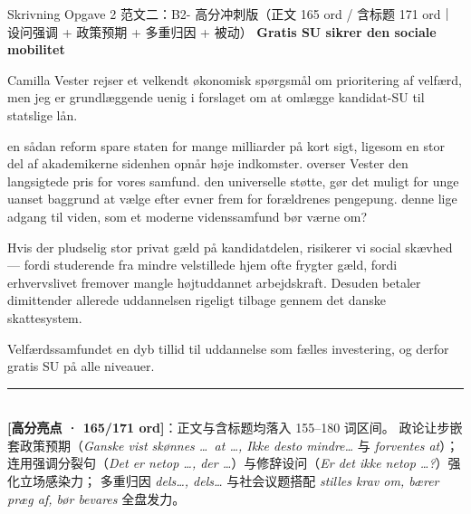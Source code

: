 \begin{emailbox}{Skrivning Opgave 2 范文二：B2- 高分冲刺版（正文 165 ord / 含标题 171 ord｜设问强调 + 政策预期 + 多重归因 + 被动）}
\textbf{\color{NCDNavy}Gratis SU sikrer den sociale mobilitet}

\vspace{0.25em}
Camilla Vester rejser et velkendt økonomisk spørgsmål om prioritering af velfærd, men jeg er grundlæggende uenig i forslaget om at omlægge kandidat-SU til statslige lån.

\vspace{0.25em}
 en sådan reform  spare staten for mange milliarder på kort sigt, ligesom en stor del af akademikerne sidenhen opnår høje indkomster.  overser Vester den langsigtede pris for vores samfund.  den universelle støtte,  gør det muligt for unge uanset baggrund at vælge efter evner frem for forældrenes pengepung.  denne lige adgang til viden, som et moderne videnssamfund bør værne om?

\vspace{0.25em}
Hvis der pludselig  stor privat gæld på kandidatdelen, risikerer vi social skævhed ---  fordi studerende fra mindre velstillede hjem ofte frygter gæld,  fordi erhvervslivet fremover  mangle højtuddannet arbejdskraft. Desuden betaler dimittender allerede uddannelsen rigeligt tilbage gennem det danske skattesystem.

\vspace{0.25em}
Velfærdssamfundet  en dyb tillid til uddannelse som fælles investering, og derfor  gratis SU  på alle niveauer.

\vspace{0.3em}
\rule{\linewidth}{0.4pt}\\[0.2em]
\small\textbf{\color{NCDNavy}[高分亮点 · 165/171 ord]}：正文与含标题均落入 155--180 词区间。 政论让步嵌套政策预期（\textit{Ganske vist skønnes \ldots\ at \ldots, Ikke desto mindre\ldots} 与 \textit{forventes at}）； 连用强调分裂句（\textit{Det er netop \ldots, der \ldots}）与修辞设问（\textit{Er det ikke netop \ldots?}）强化立场感染力； 多重归因 \textit{dels\ldots, dels\ldots} 与社会议题搭配 \textit{stilles krav om, bærer præg af, bør bevares} 全盘发力。
\end{emailbox}

